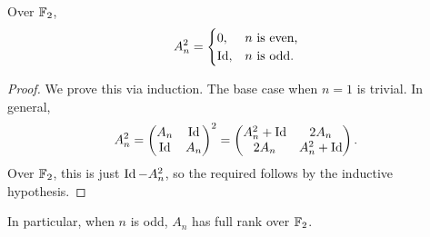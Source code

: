 \begin{flem}
	Over $\mathbb{F}_2$,
	\[ A_n^2 = \begin{cases} 0, & n\text{ is even,} \\ \operatorname{Id}, & n\text{ is odd.} \end{cases}  \]
\end{flem}
\begin{proof}
	We prove this via induction. The base case when $n = 1$ is trivial. In general,
	\[ A_n^2 = \begin{pmatrix} A_n & \operatorname{Id} \\ \operatorname{Id} & A_n \end{pmatrix}^2 = \begin{pmatrix} A_n^2 + \operatorname{Id} & 2A_n \\ 2A_n & A_n^2 + \operatorname{Id} \end{pmatrix}. \]
	Over $\mathbb{F}_2$, this is just $\operatorname{Id} - A_n^2$, so the required follows by the inductive hypothesis.
\end{proof}

In particular, when $n$ is odd, $A_n$ has full rank over $\mathbb{F}_2$. 


